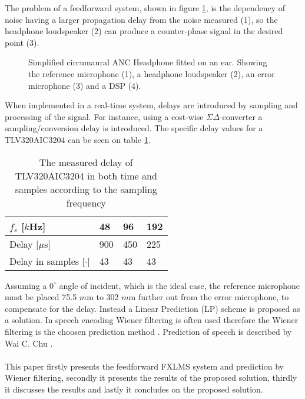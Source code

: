 The problem of a feedforward system, shown in figure \ref{fig:SystemOverview}, is the dependency of noise having a larger propagation delay from the noise measured (1), so the headphone loudspeaker (2) can produce a counter-phase signal in the desired point (3). 
\begin{figure}[H]
	\centering
	
	\caption{Simplified circumaural ANC Headphone fitted on an ear. Showing the reference microphone (1), a headphone loudspeaker (2), an error microphone (3) and a DSP (4).}
	\label{fig:SystemOverview}
\end{figure}
When implemented in a real-time system, delays are introduced by sampling and processing of the signal. For instance, using a cost-wise $\Sigma\Delta$-converter a sampling/conversion delay is introduced. The specific delay values for a TLV320AIC3204 can be seen on table \ref{tab:DelayResults}.




\begin{table}[H]
	\centering
	\begin{tabular}{|l|l|l|l|}
	\hline
	$f_s$ {[}$k$Hz{]} & 48 & 96 & 192 \\ \hline
	Delay {[}$\mu$s{]} & 900 & 450 & 225 \\ \hline
	Delay in samples {[}$\cdot${]} & 43 & 43 & 43 \\ \hline
\end{tabular}
	\caption{The measured delay of TLV320AIC3204 in both time and samples according to the sampling frequency}
	\label{tab:DelayResults}
\end{table}

Assuming a $\text{0}^{\circ}$ angle of incident, which is the ideal case, the reference microphone must be placed 75.5 $m$m to 302 $m$m further out from the error microphone, to compensate for the delay. Instead a Linear Prediction (LP) scheme is proposed as a solution. In speech encoding Wiener filtering is often used therefore the Wiener filtering is the choosen prediction method \cite{Speech}.
Prediction of speech is described by Wai C. Chu \cite{Speech}. 
\\\\
This paper firstly presents the feedforward FXLMS system and prediction by Wiener filtering, secondly it presents the results of the proposed solution, thirdly it discusses the results and lastly it concludes on the proposed solution.
        
